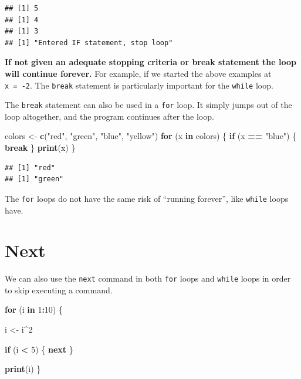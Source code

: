 \documentclass[
]{book}
\newenvironment{Shaded}{\begin{snugshade}}{\end{snugshade}}
\newcommand{\ControlFlowTok}[1]{\textcolor[rgb]{0.13,0.29,0.53}{\textbf{#1}}}
\newcommand{\DecValTok}[1]{\textcolor[rgb]{0.00,0.00,0.81}{#1}}
\newcommand{\KeywordTok}[1]{\textcolor[rgb]{0.13,0.29,0.53}{\textbf{#1}}}
\newcommand{\NormalTok}[1]{#1}
\newcommand{\OperatorTok}[1]{\textcolor[rgb]{0.81,0.36,0.00}{\textbf{#1}}}
\newcommand{\StringTok}[1]{\textcolor[rgb]{0.31,0.60,0.02}{#1}}
\begin{document}
\begin{verbatim}
## [1] 5
## [1] 4
## [1] 3
## [1] "Entered IF statement, stop loop"
\end{verbatim}

\textbf{If not given an adequate stopping criteria or break statement the loop will continue forever.} For example, if we started the above examples at \texttt{x\ =\ -2}. The \texttt{break} statement is particularly important for the \texttt{while} loop.

The \texttt{break} statement can also be used in a \texttt{for} loop. It simply jumps out of the loop altogether, and the program continues after the loop.

\begin{Shaded}
\begin{Highlighting}[]
\NormalTok{colors <-}\StringTok{ }\KeywordTok{c}\NormalTok{(}\StringTok{"red"}\NormalTok{, }\StringTok{"green"}\NormalTok{, }\StringTok{"blue"}\NormalTok{, }\StringTok{"yellow"}\NormalTok{)}
\ControlFlowTok{for}\NormalTok{ (x }\ControlFlowTok{in}\NormalTok{ colors) \{}
    \ControlFlowTok{if}\NormalTok{ (x }\OperatorTok{==}\StringTok{ "blue"}\NormalTok{) \{}
        \ControlFlowTok{break}
\NormalTok{    \}}
    \KeywordTok{print}\NormalTok{(x)}
\NormalTok{\}}
\end{Highlighting}
\end{Shaded}

\begin{verbatim}
## [1] "red"
## [1] "green"
\end{verbatim}

The \texttt{for} loops do not have the same risk of ``running forever'', like \texttt{while} loops have.

\hypertarget{next}{%
\section{Next}\label{next}}

We can also use the \texttt{next} command in both \texttt{for} loops and \texttt{while} loops in order to skip executing a command.

\begin{Shaded}
\begin{Highlighting}[]
\ControlFlowTok{for}\NormalTok{ (i }\ControlFlowTok{in} \DecValTok{1}\OperatorTok{:}\DecValTok{10}\NormalTok{) \{}

\NormalTok{    i <-}\StringTok{ }\NormalTok{i}\OperatorTok{^}\DecValTok{2}

    \ControlFlowTok{if}\NormalTok{ (i }\OperatorTok{<}\StringTok{ }\DecValTok{5}\NormalTok{) \{}
        \ControlFlowTok{next}
\NormalTok{    \}}

    \KeywordTok{print}\NormalTok{(i)}
\NormalTok{\}}
\end{Highlighting}
\end{Shaded}
\end{document}
